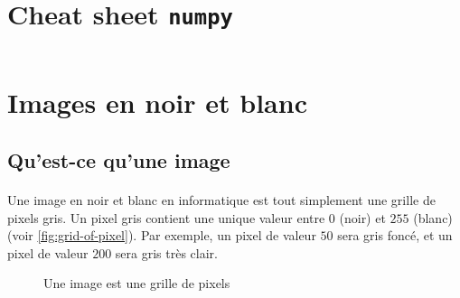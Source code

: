 

\section*{Cheat sheet \texttt{numpy}}

\inputminted{python}{minted/10/cheat_sheet_numpy.py}

\section{Images en noir et blanc}

\subsection{Qu'est-ce qu'une image}

\paragraph*{} Une image en noir et blanc en informatique est tout simplement une grille de pixels gris. Un pixel gris contient une unique valeur entre $ 0 $ (noir) et $ 255 $ (blanc) (voir \autoref{fig:grid-of-pixel}). Par exemple, un pixel de valeur $ 50 $ sera gris foncé, et un pixel de valeur $ 200 $ sera gris très clair.

\begin{figure}[h!]
    \begin{center}
    \end{center}
    \caption{Une image est une grille de pixels}
    \label{fig:grid-of-pixel}
\end{figure}


